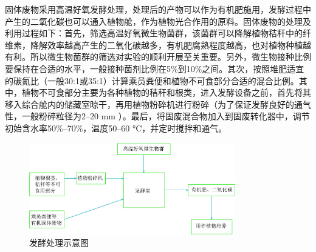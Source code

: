 固体废物采用高温好氧发酵处理，处理后的产物可以作为有机肥施用，发酵过程中产生的二氧化碳也可以通入植物舱，作为植物光合作用的原料。固体废物的处理及利用过程如下：首先，筛选高温好氧微生物菌群，该菌群可以降解植物秸秆中的纤维素，降解效率越高产生的二氧化碳越多，有机肥腐熟程度越高，也对植物种植越有利。所以微生物菌群的筛选对实验的顺利开展至关重要。另外，微生物接种比例要保持在合适的水平，一般接种菌剂比例在5\%到10\%之间。其次，按照堆肥适宜的碳氮比（一般30:1或35:1）计算乘员粪便和植物不可食部分合适的混合比例。其中，植物不可食部分主要为各种植物的秸秆和根类，进入发酵设备之前，首先将其移入综合舱内的储藏室晾干，再用植物粉碎机进行粉碎（为了保证发酵良好的通气性，一般粉碎粒径为2--20 \si{\milli\metre} ）。最后，将固废混合物加入到固废转化器中，调节初始含水率50\%--70\%，温度50--60 \si{\degreeCelsius}，并定时搅拌和通气。

\begin{figure}[H]
\label{chp:recycling:end}
  \includegraphics[width=0.8\textwidth]{figure/fajiao.eps}
  \centering
  \caption{发酵处理示意图}
\end{figure}
